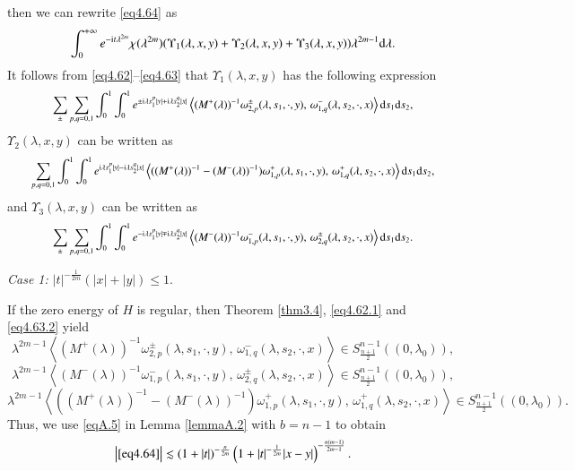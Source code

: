 \documentclass[11pt,reqno]{amsart}
\def\d{{\rm d}}
\def\i{{\rm i}}
\numberwithin{equation}{section}
\theoremstyle{definition}
\begin{document}
then we can rewrite \eqref{eq4.64} as
\begin{equation*}
\int_{0}^{+\infty}e^{-\i t\lambda^{2m}}\chi(\lambda^{2m})(\Upsilon_{1}(\lambda,x,y)+\Upsilon_{2}(\lambda,x,y)+\Upsilon_{3}(\lambda,x,y))\lambda^{2m-1}\d\lambda.
\end{equation*}
It follows from \eqref{eq4.62}--\eqref{eq4.63} that $\Upsilon_{1}(\lambda,x,y)$ has the following expression
\begin{equation*}\label{eq4.65}\small
\begin{aligned}
	\sum_{\pm}\sum_{p,q=0,1}\int_{0}^{1}\int_{0}^{1}e^{\pm \i\lambda s_{1}^{p}|y|+\i\lambda s_{2}^{q}|x|}\left\langle  (M^+(\lambda))^{-1}\omega_{2,p}^{\pm}(\lambda,s_{1},\cdot,y),\,\omega_{1,q}^{-}(\lambda,s_{2},\cdot,x)\right\rangle \d s_{1}\d s_{2},
\end{aligned}
\end{equation*}
$\Upsilon_{2}(\lambda,x,y)$ can be written as
\begin{equation*}\label{eq4.66.1}\small
\begin{aligned}
	\sum_{p,q=0,1}\int_{0}^{1}\int_{0}^{1}e^{\i\lambda s_{1}^{p}|y|-\i\lambda s_{2}^{q}|x|}\left\langle  ((M^+(\lambda))^{-1}-(M^-(\lambda))^{-1})\omega_{1,p}^{+}(\lambda,s_{1},\cdot,y),\,\omega_{1,q}^{+}(\lambda,s_{2},\cdot,x)\right\rangle \d s_{1}\d s_{2},
\end{aligned}
\end{equation*}
and	$\Upsilon_{3}(\lambda,x,y)$ can be written as
\begin{equation*}\label{eq4.66}\small
\begin{aligned}
	\sum_{\pm}\sum_{p,q=0,1}\int_{0}^{1}\int_{0}^{1}e^{-\i\lambda s_{1}^{p}|y|\mp \i\lambda s_{2}^{q}|x|}\left\langle  (M^-(\lambda))^{-1}\omega_{1,p}^{-}(\lambda,s_{1},\cdot,y),\,\omega_{2,q}^{\pm}(\lambda,s_{2},\cdot,x)\right\rangle \d s_{1}\d s_{2}.
\end{aligned}
\end{equation*}


\noindent\emph{Case 1:} $|t|^{-\frac{1}{2m}}(|x|+|y|)\leq1$.\

If the zero energy of $H$ is regular, then Theorem \ref{thm3.4}, \eqref{eq4.62.1} and \eqref{eq4.63.2} yield
$$\lambda^{2m-1}\left\langle  (M^+(\lambda))^{-1}\omega_{2,p}^{\pm}(\lambda,s_{1},\cdot,y),\,\omega_{1,q}^{-}(\lambda,s_{2},\cdot,x)\right\rangle\in S_{\frac{n+1}{2}}^{n-1}((0,\lambda_{0})),$$
$$\lambda^{2m-1}\left\langle  (M^-(\lambda))^{-1}\omega_{1,p}^{-}(\lambda,s_{1},\cdot,y),\,\omega_{2,q}^{\pm}(\lambda,s_{2},\cdot,x)\right\rangle\in S_{\frac{n+1}{2}}^{n-1}((0,\lambda_{0})),$$
$$\lambda^{2m-1}\left\langle ((M^+(\lambda))^{-1}-(M^-(\lambda))^{-1})\omega_{1,p}^{+}(\lambda,s_{1},\cdot,y),\,\omega_{1,q}^{+}(\lambda,s_{2},\cdot,x)\right\rangle \in S_{\frac{n+1}{2}}^{n-1}((0,\lambda_{0})).$$
Thus, we use \eqref{eqA.5} in Lemma \ref{lemmaA.2} with $b=n-1$ to obtain
\begin{equation}\label{eq4.67}
	\left| \eqref{eq4.64}\right| \lesssim (1+|t|)^{-\frac{n}{2m}}\left(1+|t|^{-\frac{1}{2m}}|x-y|\right)^{-\frac{n(m-1)}{2m-1}}.
\end{equation}
\end{document}
